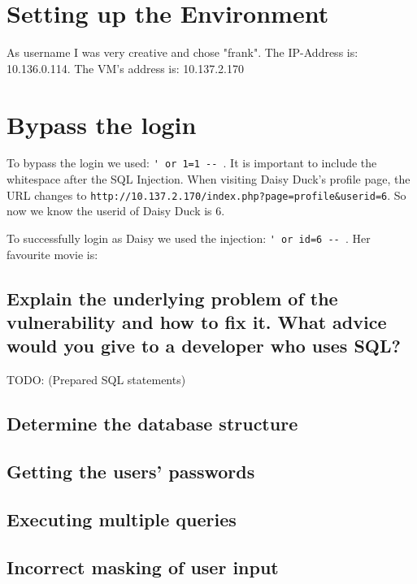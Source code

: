 \section{Setting up the Environment}

As username I was very creative and chose "frank". The IP-Address is: 10.136.0.114. The VM's address is: 10.137.2.170

\section{Bypass the login}

To bypass the login we used: \verb|' or 1=1 -- |. It is important to include the whitespace after the SQL Injection. When visiting Daisy Duck's profile page, the URL changes to \verb|http://10.137.2.170/index.php?page=profile&userid=6|. So now we know the userid of Daisy Duck is 6.

To successfully login as Daisy we used the injection: \verb|' or id=6 -- |. Her favourite movie is: 

\subsection{Explain the underlying problem of the vulnerability and how to fix it. What advice would you give to a developer who uses SQL?}

TODO: (Prepared SQL statements)

\subsection{Determine the database structure}

\subsection{Getting the users’ passwords}

\subsection{Executing multiple queries}

\subsection{Incorrect masking of user input}